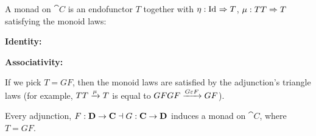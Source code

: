 \begin{definition}[Monad]
A monad on $\cat{C}$ is an endofunctor $T$ together with $\eta: \mathrm{Id}_{  } \Rightarrow T$, $\mu: TT \Rightarrow T$ satisfying the monoid laws:

\textbf{Identity:}
\begin{center}
\end{center}

\textbf{Associativity:}
\begin{center}
\end{center}
\end{definition}

If we pick $T = GF$, then the monoid laws are satisfied by the adjunction's triangle laws (for example, $TT \xrightarrow{\mu} T$ is equal to $GFGF \xrightarrow{G \varepsilon F} GF$).

\begin{proposition}
Every adjunction, $F: \mathbf{D} \to \mathbf{C} \dashv G: \mathbf{C} \to \mathbf{D}$ induces a monad on $\cat{C}$, where $T = GF$.

\begin{center}
\end{center}
\end{proposition}